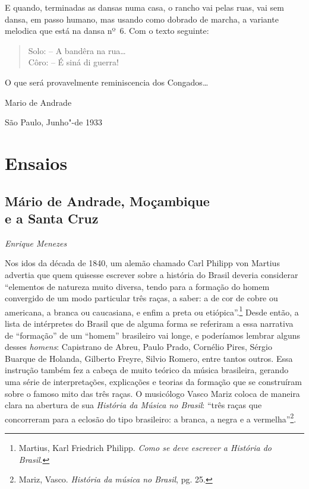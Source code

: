 E quando, terminadas as dansas numa casa, o rancho vai pelas ruas, vai
sem dansa, em passo humano, mas usando como dobrado de marcha, a
variante melodica que está na dansa nº~6. Com o texto seguinte:

\begin{verse}
Solo: -- A bandêra na rua\ldots{}\\
Côro: -- É siná di guerra!\\[5pt]
\end{verse}

\noindent{}O que será provavelmente reminiscencia dos Congados\ldots{}

\begin{flushright}
\vfill
Mario de Andrade

São Paulo, Junho"-de 1933
\end{flushright}

\part{Ensaios}

\chapter*{Mário de Andrade, Moçambique\\ e a Santa Cruz}

\begin{flushright}
\emph{Enrique Menezes}
\end{flushright}

Nos idos da década de 1840, um alemão chamado Carl Philipp von Martius
advertia que quem quisesse escrever sobre a história do Brasil deveria
considerar ``elementos de natureza muito diversa, tendo para a formação
do homem convergido de um modo particular três raças, a saber: a de cor
de cobre ou americana, a branca ou caucasiana, e enfim a preta ou
etiópica''.\footnote{Martius, Karl Friedrich Philipp. \emph{Como se deve
  escrever a História do Brasil}.} Desde então, a lista de intérpretes
do Brasil que de alguma forma se referiram a essa narrativa de
``formação'' de um ``homem'' brasileiro vai longe, e poderíamos lembrar
alguns desses \emph{homens}: Capistrano de Abreu, Paulo Prado, Cornélio
Pires, Sérgio Buarque de Holanda, Gilberto Freyre, Silvio Romero, entre
tantos outros. Essa instrução também fez a cabeça de muito teórico da
música brasileira, gerando uma série de interpretações, explicações e
teorias da formação que se construíram sobre o famoso mito das três
raças. O musicólogo Vasco Mariz coloca de maneira clara na abertura de
sua \emph{História da Música no Brasil}: ``três raças que concorreram
para a eclosão do tipo brasileiro: a branca, a negra e a
vermelha''\footnote{Mariz, Vasco. \emph{História da música no Brasil},
  pg. 25.}.

